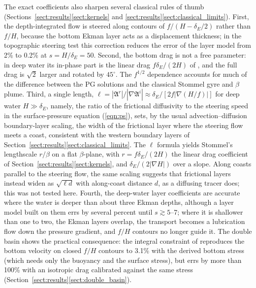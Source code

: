 \documentclass{ametsocV6.2}
\begin{document}
The exact coefficients also sharpen several classical rules of thumb (Sections~\ref{sect:results}\ref{sect:kernels} and \ref{sect:results}\ref{sect:classical_limits}).
First, the depth-integrated flow is steered along contours of $f/(H - \delta_E/2)$ rather than $f/H$, because the bottom Ekman layer acts as a displacement thickness; in the topographic steering test this correction reduces the error of the layer model from 2\% to 0.2\% at $s = H/\delta_E = 50$.
Second, the bottom drag is not a free parameter: in deep water its in-phase part is the linear drag $f \delta_E/(2H)$ of \citet{stommel48}, and the full drag is $\sqrt{2}$ larger and rotated by $45^\circ$. 
The $f^{1/2}$ dependence accounts for much of the difference between the PG solutions and the classical Stommel gyre and $\beta$ plume.
Third, a single length, $\ell = |\mathfrak{A}^r| / |\nabla \mathfrak{A}^i| \approx \delta_E / \left[ 2 f \left| \nabla (H/f) \right| \right]$ for deep water $H \gg \delta_E$, namely, the ratio of the frictional diffusivity to the steering speed in the surface-pressure equation (\ref{eqn:ps}), sets, by the usual advection--diffusion boundary-layer scaling, the width of the frictional layer where the steering flow meets a coast, consistent with the western boundary layers of Section~\ref{sect:results}\ref{sect:classical_limits}.
The $\ell$ formula yields Stommel's lengthscale $r/\beta$ on a flat $\beta$-plane, with $r = f \delta_E/(2H)$ the linear drag coefficient of Section~\ref{sect:results}\ref{sect:kernels}, and $\delta_E/(2|\nabla H|)$ over a slope.
Along coasts parallel to the steering flow, the same scaling suggests that frictional layers instead widen as $\sqrt{\ell d}$ with along-coast distance $d$, as a diffusing tracer does; this was not tested here.
Fourth, the deep-water layer coefficients are accurate where the water is deeper than about three Ekman depths, although a layer model built on them errs by several percent until $s \gtrsim 5$--7; where it is shallower than one to two, the Ekman layers overlap, the transport becomes a lubrication flow down the pressure gradient, and $f/H$ contours no longer guide it.
The double basin shows the practical consequence: the integral constraint of \citet{nost&isachsen03} reproduces the bottom velocity on closed $f/H$ contours to 3.1\% with the derived bottom stress (which needs only the buoyancy and the surface stress), but errs by more than 100\% with an isotropic drag calibrated against the same stress (Section~\ref{sect:results}\ref{sect:double_basin}).
\end{document}
